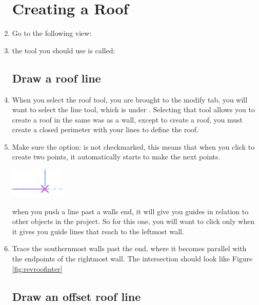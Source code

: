 \documentclass{tufte-book} %
\begin{document}
\begin{enumerate}
	\section{Creating a Roof}
	\item Go to the following view: 
	\item the tool you should use is called: 
	\subsection{Draw a roof line}
	\item When you select the roof tool, you are brought to the modify tab, you will want to select the line tool, which is under . Selecting that tool allows you to create a roof in the same was as a wall, except to create a roof, you must create a closed perimeter with your lines to define the roof.
	\item Make sure the option:  is not checkmarked, this means that when you click to create two points, it automatically starts to make the next points. 
	
	\begin{marginfigure}
		\includegraphics[width=\linewidth]{revitroofintersect.png}
		\caption[Revit Roof Intersection]{when you push a line past a walls end, it will give you guides in relation to other objects in the project. So for this one, you will want to click only when it gives you guide lines that reach to the leftmost wall.}
		\label{fig:revroofinter}
	\end{marginfigure}
	
	\item Trace the southernmost walls past the end, where it becomes parallel with the endpoints of the rightmost wall. The intersection should look like Figure \ref{fig:revroofinter}
	
	\subsection{Draw an offset roof line}
	

\end{enumerate}
\end{document}
